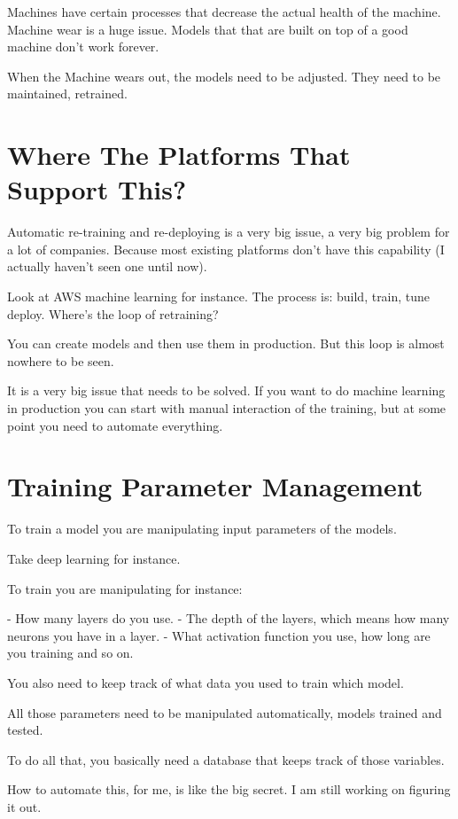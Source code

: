 \documentclass[12pt, numbers=noenddot]{scrreprt} %
\begin{document}
Machines have certain processes that decrease the actual health of the machine. Machine wear is a huge issue. Models that that are built on top of a good machine don’t work forever.

When the Machine wears out, the models need to be adjusted. They need to be maintained, retrained.


\section{Where The Platforms That Support This?}

Automatic re-training and re-deploying is a very big issue, a very big problem for a lot of companies. Because most existing platforms don’t have this capability (I actually haven't seen one until now).

Look at AWS machine learning for instance. The process is: build, train, tune deploy. Where’s the loop of retraining?

You can create models and then use them in production. But this loop is almost nowhere to be seen.

It is a very big issue that needs to be solved. If you want to do machine learning in production you can start with manual interaction of the training, but at some point you need to automate everything.

\section{Training Parameter Management}

To train a model you are manipulating input parameters of the models.

Take deep learning for instance.

To train you are manipulating for instance:

- How many layers do you use.
- The depth of the layers, which means how many neurons you have in a layer.
- What activation function you use, how long are you training and so on.

You also need to keep track of what data you used to train which model.

All those parameters need to be manipulated automatically, models trained and tested.

To do all that, you basically need a database that keeps track of those variables.

How to automate this, for me, is like the big secret. I am still working on figuring it out.
\end{document}
